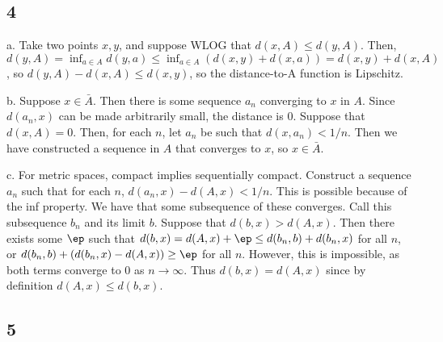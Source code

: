 \documentclass{article}
\begin{document}
\subsection*{4}
a. Take two points $x,y$, and suppose WLOG that $d(x,A)\leq d(y,A)$. Then, $d(y,A)=\inf_{a\in A}d(y,a)\leq\inf_{a\in A}(d(x,y)+d(x,a))=d(x,y)+d(x,A)$, so $d(y,A)-d(x,A)\leq d(x,y)$, so the distance-to-A function is Lipschitz.

b. Suppose $x\in\bar{A}$. Then there is some sequence $a_n$ converging to $x$ in $A$. Since $d(a_n,x)$ can be made arbitrarily small, the distance is $0$. Suppose that $d(x,A)=0$. Then, for each $n$, let $a_n$ be such that $d(x,a_n)<1/n$. Then we have constructed a sequence in $A$ that converges to $x$, so $x\in\bar{A}$.

c. For metric spaces, compact implies sequentially compact. Construct a sequence $a_n$ such that for each $n$, $d(a_n,x)-d(A,x)<1/n$. This is possible because of the inf property. We have that some subsequence of these converges. Call this subsequence $b_n$ and its limit $b$. Suppose that $d(b,x)>d(A,x)$. Then there exists some $\ep$ such that $d(b,x)=d(A,x)+\ep\leq d(b_n,b)+d(b_n,x)$ for all $n$, or $d(b_n,b)+(d(b_n,x)-d(A,x))\geq\ep$ for all $n$. However, this is impossible, as both terms converge to $0$ as $n\to\infty$. Thus $d(b,x)=d(A,x)$ since by definition $d(A,x)\leq d(b,x)$.

\subsection*{5}
\end{document}
